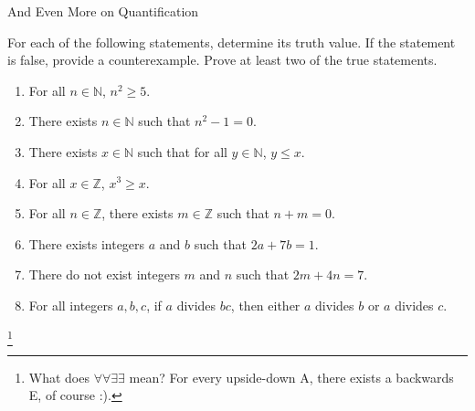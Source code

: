 \begin{section}{And Even More on Quantification}
\begin{problem}
For each of the following statements, determine its truth value.  If the statement is false, provide a counterexample.  Prove at least two of the true statements.
\begin{enumerate}
\item For all $n\in\mathbb{N}$, $n^2\geq 5$.

\item There exists $n \in \mathbb{N}$ such that $n^2-1=0$.


\item There exists $x \in \mathbb{N}$ such that for all $y \in \mathbb{N}$, $y \leq x$.

\item For all $x\in\mathbb{Z}$, $x^3\geq x$.

\item For all $n\in\mathbb{Z}$, there exists $m\in\mathbb{Z}$ such that $n+m=0$.

\item There exists integers $a$ and $b$ such that $2a+7b=1$.

\item There do not exist integers $m$ and $n$ such that $2m+4n=7$.

\item For all integers $a, b, c$, if $a$ divides $bc$, then either $a$ divides $b$ or $a$ divides $c$.



\end{enumerate}
\footnote{What does $\forall \forall \exists\exists$ mean?  For every
  upside-down A, there exists a backwards E, of course :).}
\end{problem}

\end{section}

